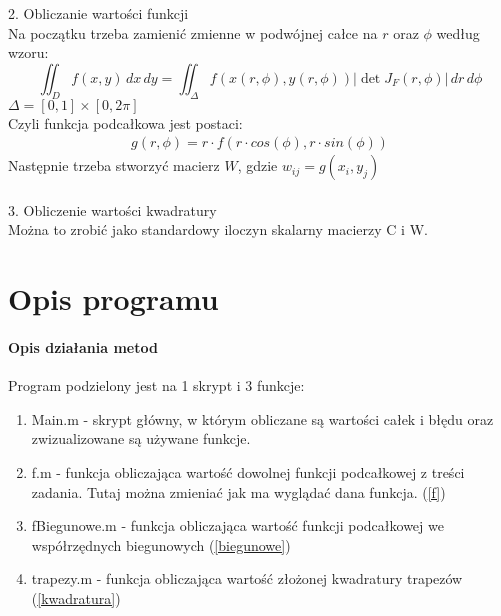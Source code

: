 \documentclass{article}
\begin{document}
2. Obliczanie wartości funkcji \\
Na początku trzeba zamienić zmienne w podwójnej całce na $r$ oraz $\phi$ według wzoru:
\[\iint_D f(x,y) \,dx\,dy = \iint_\Delta f(x(r,\phi),y(r,\phi))|\det J_F(r,\phi)| \,dr\,d\phi\]
$\Delta = [0,1]\times[0,2\pi]$\\
Czyli funkcja podcałkowa jest postaci:
\begin{align}\label{biegunowe}
    g(r,\phi) = r\cdot f(r\cdot cos(\phi),r\cdot sin(\phi))
\end{align}
Następnie trzeba stworzyć macierz $W$, gdzie $w_{ij} = g(x_i, y_j)$\\\\
3. Obliczenie wartości kwadratury\\
Można to zrobić jako standardowy iloczyn skalarny macierzy C i W.

\section{Opis programu}
\paragraph{Opis działania metod\\}
Program podzielony jest na 1 skrypt i 3 funkcje:
\begin{enumerate}
    \item Main.m - skrypt główny, w którym obliczane są wartości całek i błędu oraz zwizualizowane są używane funkcje.
    \item f.m - funkcja obliczająca wartość dowolnej funkcji podcałkowej z treści zadania. Tutaj można zmieniać jak ma wyglądać dana funkcja. (\ref{f})
    \item fBiegunowe.m - funkcja obliczająca wartość funkcji podcałkowej we współrzędnych biegunowych (\ref{biegunowe})
    \item trapezy.m - funkcja obliczająca wartość złożonej kwadratury trapezów (\ref{kwadratura})
\end{enumerate}
\end{document}
